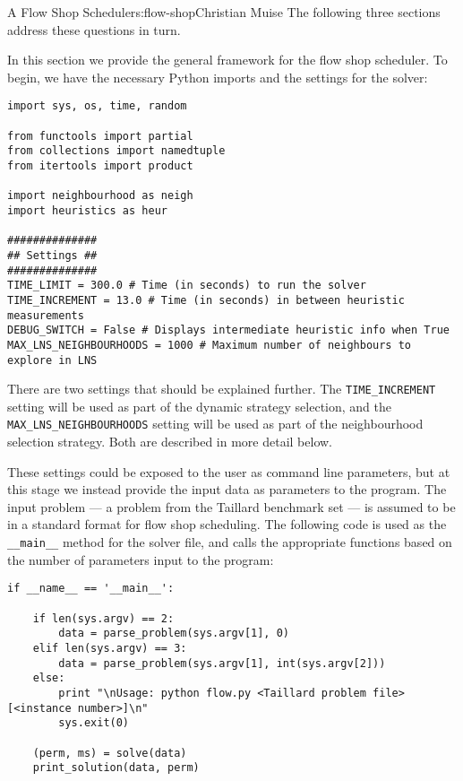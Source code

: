 \begin{aosachapter}{A Flow Shop Scheduler}{s:flow-shop}{Christian Muise}
The following three sections address these questions in turn.

\label{general-solver}

In this section we provide the general framework for the flow shop
scheduler. To begin, we have the necessary Python imports and the
settings for the solver:

\begin{verbatim}
import sys, os, time, random

from functools import partial
from collections import namedtuple
from itertools import product

import neighbourhood as neigh
import heuristics as heur

##############
## Settings ##
##############
TIME_LIMIT = 300.0 # Time (in seconds) to run the solver
TIME_INCREMENT = 13.0 # Time (in seconds) in between heuristic measurements
DEBUG_SWITCH = False # Displays intermediate heuristic info when True
MAX_LNS_NEIGHBOURHOODS = 1000 # Maximum number of neighbours to explore in LNS
\end{verbatim}

There are two settings that should be explained further. The
\texttt{TIME\_INCREMENT} setting will be used as part of the dynamic
strategy selection, and the \texttt{MAX\_LNS\_NEIGHBOURHOODS} setting
will be used as part of the neighbourhood selection strategy. Both are
described in more detail below.

These settings could be exposed to the user as command line parameters,
but at this stage we instead provide the input data as parameters to the
program. The input problem --- a problem from the Taillard benchmark set
--- is assumed to be in a standard format for flow shop scheduling. The
following code is used as the \texttt{\_\_main\_\_} method for the
solver file, and calls the appropriate functions based on the number of
parameters input to the program:

\begin{verbatim}
if __name__ == '__main__':

    if len(sys.argv) == 2:
        data = parse_problem(sys.argv[1], 0)
    elif len(sys.argv) == 3:
        data = parse_problem(sys.argv[1], int(sys.argv[2]))
    else:
        print "\nUsage: python flow.py <Taillard problem file> [<instance number>]\n"
        sys.exit(0)

    (perm, ms) = solve(data)
    print_solution(data, perm)
\end{verbatim}


\end{aosachapter}
